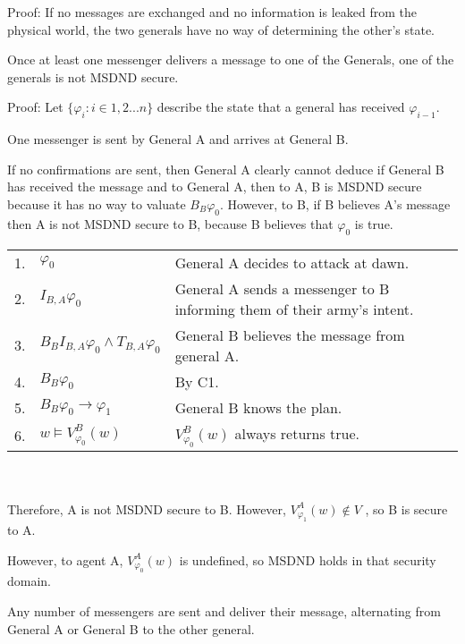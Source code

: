 Proof: If no messages are exchanged and no information is leaked from the physical world, the two generals have no way of determining the other's state.

\begin{thm}
Once at least one messenger delivers a message to one of the Generals, one of the generals is not MSDND secure.
\end{thm}

Proof:
Let $\{ \varphi_i : i \in 1,2 ... n \}$ describe the state that a general has received $\varphi_{i-1}$.

\begin{case}
One messenger is sent by General A and arrives at General B.
\label{case:generalsn0}
\end{case}

If no confirmations are sent, then General A clearly cannot deduce if General B has received the message and to General A, then to A, B is MSDND secure because it has no way to valuate $B_B \varphi_0$. However, to B, if B believes A's message then A is not MSDND secure to B, because B believes that $\varphi_0$ is true.

\begin{table}[h!]
\centering
\small
\begin{tabularx}{\linewidth}{l l X}
1. & $\varphi_0$ & General A decides to attack at dawn. \\
2. & $I_{B,A} \varphi_0$ & General A sends a messenger to B informing them of their army's intent. \\
3. & $B_{B}I_{B,A} \varphi_0 \wedge T_{B,A} \varphi_0$ & General B believes the message from general A. \\
4. & $B_{B} \varphi_0$ & By C1. \\
5. & $B_{B} \varphi_0 \rightarrow \varphi_1$ & General B knows the plan. \\
6. & $w \vDash V_{\varphi_0}^{B}(w)$ & $V_{\varphi_0}^{B}(w)$ always returns true. \\
\end{tabularx} \\~\\
Therefore, A is not MSDND secure to B. However, $V_{\varphi_1}^{A}(w) \not \in V$ , so B is secure to A.
\label{tab:twoarmiesproof}
\end{table}

However, to agent A, $V_{\varphi_{0}}^A(w)$ is undefined, so MSDND holds in that security domain. 

\begin{case}
Any number of messengers are sent and deliver their message, alternating from General A or General B to the other general. \label{case:generalsnn}
\end{case}

